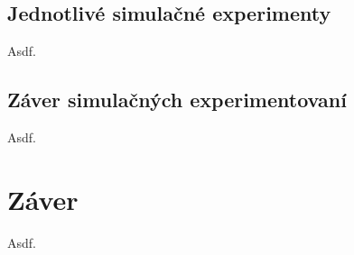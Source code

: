 \documentclass[11pt,a4paper]{article}
\begin{document}
    \subsection{Jednotlivé simulačné experimenty}

        Asdf.

    \subsection{Záver simulačných experimentovaní}

        Asdf.

\section{Záver}

    Asdf.



\newpage %

\makeatletter
\makeatother

\begin{flushleft}
    
\end{flushleft}
\end{document}
